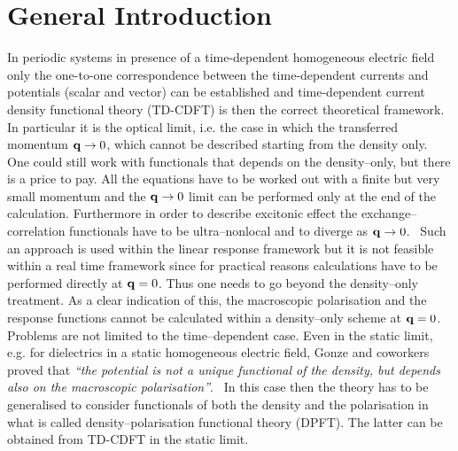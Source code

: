 \section{General Introduction}
In periodic systems in presence of a time-dependent homogeneous electric field only the one-to-one correspondence between the time-dependent currents and potentials (scalar and vector) can be established and time-dependent current density functional theory (TD-CDFT) is then the correct theoretical framework.~\cite{maitra2003current,PhysRevA.38.1149} In particular it is the optical limit, i.e. the case in which the transferred momentum ${\bf q}\rightarrow 0$,  which cannot be described starting from the density only. 
One could still work with functionals that depends on the density--only, but there is a price to pay. All the equations have to be worked out with a finite but very small momentum  and the ${\bf q}\rightarrow 0$ limit can be performed only at the end of the calculation. 
Furthermore in order to describe excitonic effect the exchange--correlation functionals have to be ultra--nonlocal and to diverge as ${\bf q} \rightarrow 0$.~\cite{PhysRevLett.88.066404} Such an approach is used within the linear response framework but it is not feasible within a real time framework since for practical reasons calculations have to be performed directly at ${\bf q}=0$. Thus one needs to go beyond the density--only treatment. As a clear indication of this, the macroscopic polarisation and the response functions cannot be calculated within a density--only scheme at ${\bf q}=0$.~\cite{PhysRevB.9.1998}
Problems are not limited to the time--dependent case. Even in the static limit, e.g. for dielectrics in a static homogeneous electric field, Gonze and coworkers proved that {\em ``the potential is not a unique functional of the density, but depends also on the macroscopic polarisation''}.~\cite{Gonze1995} In this case then the theory has to be generalised to consider functionals of both the density and the polarisation in what is called density--polarisation functional theory (DPFT). The latter can be obtained from TD-CDFT in the static limit.

